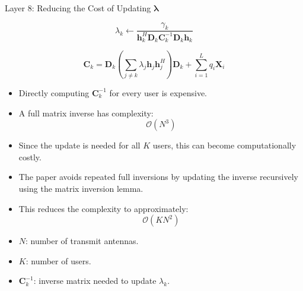 \documentclass{beamer}
\begin{document}
\begin{frame}{Layer 8: Reducing the Cost of Updating \(\boldsymbol{\lambda}\)}
\scriptsize

\[
\lambda_k
\leftarrow
\frac{\gamma_k}
{\mathbf{h}_k^H\mathbf{D}_k\mathbf{C}_k^{-1}\mathbf{D}_k\mathbf{h}_k}
\]

\[
\mathbf{C}_k
=
\mathbf{D}_k
\left(
\sum_{j\ne k}\lambda_j\mathbf{h}_j\mathbf{h}_j^H
\right)
\mathbf{D}_k
+
\sum_{i=1}^{L}q_i\mathbf{X}_i
\]

\begin{itemize}
    \item Directly computing \(\mathbf{C}_k^{-1}\) for every user is expensive.

    \item A full matrix inverse has complexity:
    \[
        \mathcal{O}(N^3)
    \]

    \item Since the update is needed for all \(K\) users, this can become computationally costly.

    \item The paper avoids repeated full inversions by updating the inverse recursively using the matrix inversion lemma.

    \item This reduces the complexity to approximately:
    \[
        \mathcal{O}(KN^2)
    \]

    \item \(N\): number of transmit antennas.
    \item \(K\): number of users.
    \item \(\mathbf{C}_k^{-1}\): inverse matrix needed to update \(\lambda_k\).
\end{itemize}

\end{frame}
\end{document}
